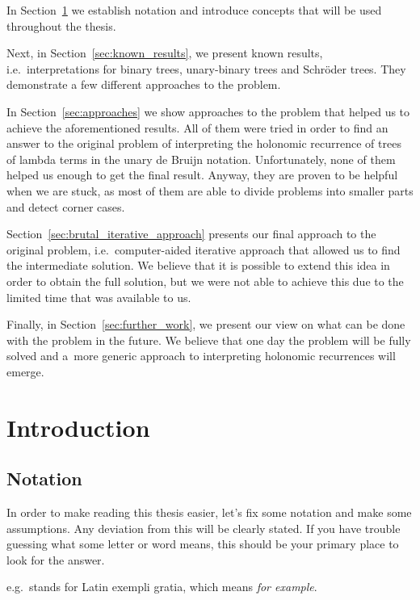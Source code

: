 \documentclass[final]{article}
\theoremstyle{definition}
\theoremstyle{definition}
\theoremstyle{remark}
\begin{document}
In Section~\ref{sec:introduction} we establish notation and introduce concepts that will be used throughout the thesis.

Next, in Section~\ref{sec:known_results}, we present known results, i.e.~interpretations for binary trees, unary-binary trees and Schröder trees. They demonstrate a few different approaches to the problem.

In Section~\ref{sec:approaches} we show approaches to the problem that helped us to achieve the aforementioned results. All of them were tried in order to find an answer to the original problem of interpreting the holonomic recurrence of trees of lambda terms in the unary de Bruijn notation. Unfortunately, none of them helped us enough to get the final result. Anyway, they are proven to be helpful when we are stuck, as most of them are able to divide problems into smaller parts and detect corner cases.

Section~\ref{sec:brutal_iterative_approach} presents our final approach to the original problem, i.e.~computer-aided iterative approach that allowed us to find the intermediate solution. We believe that it is possible to extend this idea in order to obtain the full solution, but we were not able to achieve this due to the limited time that was available to us.

Finally, in Section~\ref{sec:further_work}, we present our view on what can be done with the problem in the future. We believe that one day the problem will be fully solved and a~more generic approach to interpreting holonomic recurrences will emerge.

\clearpage

\section{Introduction}%
\label{sec:introduction}

\subsection{Notation}%
\label{sub:notation}

In order to make reading this thesis easier, let's fix some notation and make some assumptions. Any deviation from this will be clearly stated. If you have trouble guessing what some letter or word means, this should be your primary place to look for the answer.

e.g.~stands for Latin exempli gratia, which means \textit{for example}.
\end{document}
